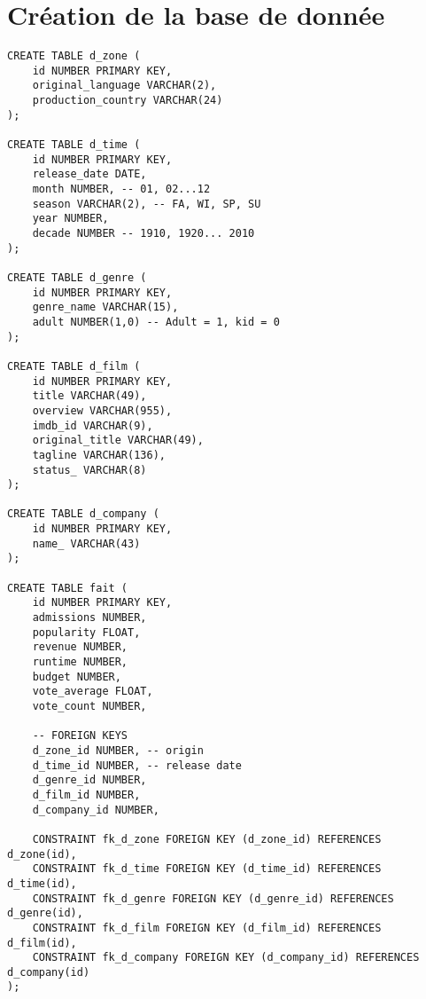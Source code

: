 \section{Création de la base de donnée}

\begin{lstlisting}
CREATE TABLE d_zone (
	id NUMBER PRIMARY KEY,
	original_language VARCHAR(2),
	production_country VARCHAR(24)
);

CREATE TABLE d_time (
	id NUMBER PRIMARY KEY,
	release_date DATE,
	month NUMBER, -- 01, 02...12
	season VARCHAR(2), -- FA, WI, SP, SU
	year NUMBER,
	decade NUMBER -- 1910, 1920... 2010
);

CREATE TABLE d_genre (
	id NUMBER PRIMARY KEY,
	genre_name VARCHAR(15),
	adult NUMBER(1,0) -- Adult = 1, kid = 0
);

CREATE TABLE d_film (
	id NUMBER PRIMARY KEY,
	title VARCHAR(49),
	overview VARCHAR(955),
	imdb_id VARCHAR(9),
	original_title VARCHAR(49),
	tagline VARCHAR(136),
	status_ VARCHAR(8)
);

CREATE TABLE d_company (
	id NUMBER PRIMARY KEY,
	name_ VARCHAR(43)
);

CREATE TABLE fait (
	id NUMBER PRIMARY KEY,
	admissions NUMBER,
	popularity FLOAT,
	revenue NUMBER,
	runtime NUMBER,
	budget NUMBER,
	vote_average FLOAT,
	vote_count NUMBER,
	
	-- FOREIGN KEYS
	d_zone_id NUMBER, -- origin
	d_time_id NUMBER, -- release date
	d_genre_id NUMBER,
	d_film_id NUMBER,
	d_company_id NUMBER,
	
	CONSTRAINT fk_d_zone FOREIGN KEY (d_zone_id) REFERENCES d_zone(id),
	CONSTRAINT fk_d_time FOREIGN KEY (d_time_id) REFERENCES d_time(id),
	CONSTRAINT fk_d_genre FOREIGN KEY (d_genre_id) REFERENCES d_genre(id),
	CONSTRAINT fk_d_film FOREIGN KEY (d_film_id) REFERENCES d_film(id),
	CONSTRAINT fk_d_company FOREIGN KEY (d_company_id) REFERENCES d_company(id)
);

\end{lstlisting}

